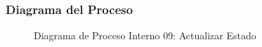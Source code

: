 \subsubsection{Diagrama del Proceso}
\begin{figure}[H]
    \centering
        \caption{Diagrama de Proceso Interno 09: Actualizar Estado}%
    \label{fig:process_diagram09}
\end{figure}
\newpage